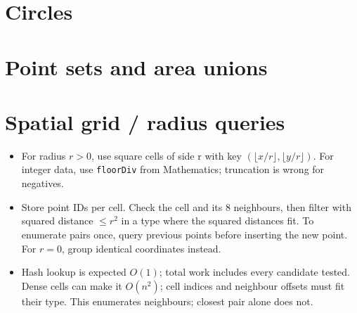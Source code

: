 \section{Circles}

\section{Point sets and area unions}

\section{Spatial grid / radius queries}
\begin{itemize}[nosep,leftmargin=*]
\item For radius $r>0$, use square cells of side r with key
$(\lfloor x/r\rfloor,\lfloor y/r\rfloor)$. For integer data, use
\texttt{floorDiv} from Mathematics; truncation is wrong for negatives.
\item Store point IDs per cell. Check the cell and its 8 neighbours,
then filter with squared distance $\le r^2$ in a type where the squared distances fit.
To enumerate pairs once, query previous points before inserting the new
point. For $r=0$, group identical coordinates instead.
\item Hash lookup is expected $O(1)$; total work includes every candidate
tested. Dense cells can make it $O(n^2)$; cell indices and neighbour offsets must fit their type.
This enumerates neighbours; closest pair alone does not.
\end{itemize}
\par
